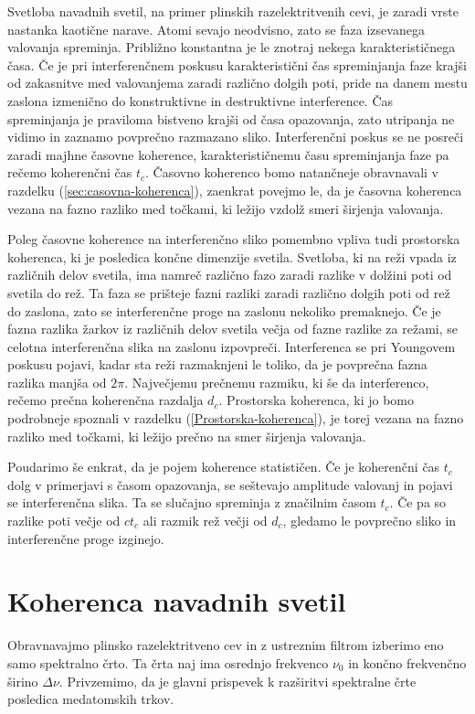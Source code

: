 Svetloba navadnih svetil, na primer plinskih razelektritvenih cevi, 
je zaradi vrste nastanka kaotične narave. 
Atomi sevajo neodvisno, zato se faza izsevanega valovanja
spreminja. Približno konstantna je le znotraj nekega karakterističnega
časa. Če je pri interferenčnem poskusu karakteristični čas spreminjanja
faze krajši od zakasnitve med valovanjema zaradi različno
dolgih poti, pride na danem mestu zaslona izmenično do konstruktivne in 
destruktivne interference. Čas spreminjanja je praviloma
bistveno krajši od časa opazovanja, zato utripanja ne vidimo in 
zaznamo povprečno razmazano sliko. Interferenčni poskus se ne 
posreči zaradi majhne časovne koherence,
karakterističnemu času spreminjanja faze pa rečemo 
koherenčni čas
$t_{c}$. Časovno koherenco bomo natančneje obravnavali v razdelku
(\ref{sec:casovna-koherenca}), zaenkrat povejmo le, da je časovna
koherenca vezana na fazno razliko med točkami, ki ležijo
vzdolž smeri širjenja valovanja. 

Poleg časovne koherence na interferenčno sliko pomembno vpliva tudi
prostorska koherenca, ki je posledica
končne dimenzije svetila. Svetloba, ki na reži vpada iz različnih delov
svetila, ima namreč različno fazo zaradi razlike v dolžini poti od
svetila do rež. Ta faza se prišteje fazni razliki zaradi različno dolgih poti 
od rež do zaslona, zato se interferenčne proge na zaslonu nekoliko 
premaknejo. Če je fazna razlika žarkov iz različnih
delov svetila večja od fazne razlike za režami, se celotna interferenčna
slika na zaslonu izpovpreči. Interferenca se pri Youngovem poskusu
pojavi, kadar sta reži razmaknjeni le toliko, da je povprečna fazna
razlika manjša od $2\pi$. Največjemu prečnemu razmiku, ki še da interferenco,
rečemo prečna koherenčna razdalja $d_{c}$. 
Prostorska koherenca, ki jo bomo podrobneje spoznali v razdelku 
(\ref{Prostorska-koherenca}),
je torej vezana na fazno razliko med točkami, ki ležijo prečno 
na smer širjenja valovanja.

Poudarimo še enkrat, da je pojem koherence statističen.
Če je koherenčni čas $t_{c}$ dolg v primerjavi s časom opazovanja,
se seštevajo amplitude valovanj in pojavi se interferenčna slika.
Ta se slučajno spreminja z značilnim časom $t_{c}$. Če pa so razlike
poti večje od $ct_{c}$ ali razmik rež večji od $d_{c}$, gledamo
le povprečno sliko in interferenčne proge izginejo.

\section{Koherenca navadnih svetil}
\label{chap:kns}
Obravnavajmo plinsko razelektritveno cev in z
ustreznim filtrom izberimo eno samo spektralno črto. Ta črta naj ima
osrednjo frekvenco $\nu_{0}$ in končno frekvenčno širino $\Delta\nu$.
Privzemimo, da je glavni prispevek k razširitvi spektralne črte posledica
medatomskih trkov.

